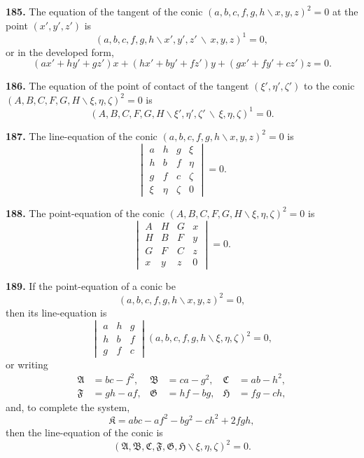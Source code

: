 \documentclass[11pt,a4paper]{book}
\begin{document}
\begin{center}
\textbf{185.} The equation of the tangent of the conic
$(a,b,c,f,g,h\!\backslash x,y,z)^2=0$ at the point $(x',y',z')$ is
\[
(a,b,c,f,g,h\!\backslash x',y',z'\,\backslash\,x,y,z)^1=0,
\]
or in the developed form,
\[
(ax'+hy'+gz')x + (hx'+by'+fz')y + (gx'+fy'+cz')z = 0.
\]

\textbf{186.} The equation of the point of contact of the tangent
$(\xi',\eta',\zeta')$ to the conic
$(A,B,C,F,G,H\!\backslash \xi,\eta,\zeta)^2=0$ is
\[
(A,B,C,F,G,H\!\backslash \xi',\eta',\zeta'\,\backslash\,\xi,\eta,\zeta)^1=0.
\]

\textbf{187.} The line-equation of the conic $(a,b,c,f,g,h\!\backslash x,y,z)^2=0$ is
\[
\begin{vmatrix}
a & h & g & \xi \\
h & b & f & \eta \\
g & f & c & \zeta \\
\xi & \eta & \zeta & 0
\end{vmatrix} = 0.
\]

\textbf{188.} The point-equation of the conic $(A,B,C,F,G,H\!\backslash \xi,\eta,\zeta)^2=0$ is
\[
\begin{vmatrix}
A & H & G & x \\
H & B & F & y \\
G & F & C & z \\
x & y & z & 0
\end{vmatrix} = 0.
\]

\textbf{189.} If the point-equation of a conic be
\[
(a,b,c,f,g,h\!\backslash x,y,z)^2=0,
\]
then its line-equation is
\[
\begin{vmatrix}
a & h & g \\
h & b & f \\
g & f & c
\end{vmatrix}
(a,b,c,f,g,h\!\backslash \xi,\eta,\zeta)^2 = 0,
\]
or writing
\begin{align*}
\mathfrak{A} &= bc-f^2, & \mathfrak{B} &= ca-g^2, & \mathfrak{C} &= ab-h^2,\\
\mathfrak{F} &= gh-af, & \mathfrak{G} &= hf-bg, & \mathfrak{H} &= fg-ch,
\end{align*}
and, to complete the system,
\[
\mathfrak{K} = abc-af^2-bg^2-ch^2+2fgh,
\]
then the line-equation of the conic is
\[
(\mathfrak{A},\mathfrak{B},\mathfrak{C},\mathfrak{F},\mathfrak{G},\mathfrak{H}\!\backslash \xi,\eta,\zeta)^2 = 0.
\]


\end{center}
\end{document}
